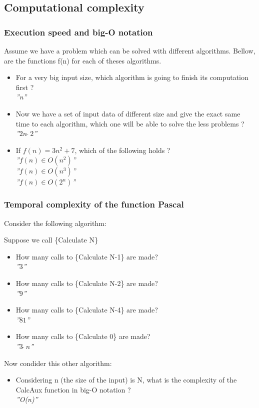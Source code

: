 \documentclass[fr,license=none]{../../../eplsummary}
\begin{document}
		\subsection{Computational complexity}
			\subsubsection*{Execution speed and big-O notation}
				Assume we have a problem which can be solved with different algorithms. Bellow, are the functions f(n) for each of theses algorithms.
				\begin{itemize}
					\item For a very big input size, which algorithm is going to finish its computation first ?\\
						\textit{''n''}
					\item Now we have a set of input data of different size and give the exact same time to each algorithm, which one will be able to solve the less problems ?\\
						\textit{''$2n\:\hat{}\:2$''}
					\item If $f(n)=3n^2+7$, which of the following holds ?\\
						\textit{''$f(n) \in O(n^2)$''}\\
						\textit{''$f(n) \in O(n^3)$''}\\
						\textit{''$f(n) \in O(2^n)$''}
				\end{itemize}
			\subsubsection*{Temporal complexity of the function Pascal}
				Consider the following algorithm:
				
				Suppose we call \{Calculate N\}
				\begin{itemize}
					\item How many calls to \{Calculate N-1\} are made?\\
						\textit{''$3$''}
					\item How many calls to \{Calculate N-2\} are made?\\
						\textit{''$9$''}
					\item How many calls to \{Calculate N-4\} are made?\\
						\textit{''$81$''}
					\item How many calls to \{Calculate 0\} are made?\\
						\textit{''$3\:\hat{}\:n$''}
				\end{itemize}
					Now condider this other algorithm:
					
				\begin{itemize}
					\item Considering n (the size of the input) is N, what is the complexity of the CalcAux function in big-O notation ?\\
						\textit{''O(n)''}
				\end{itemize}
\end{document}
